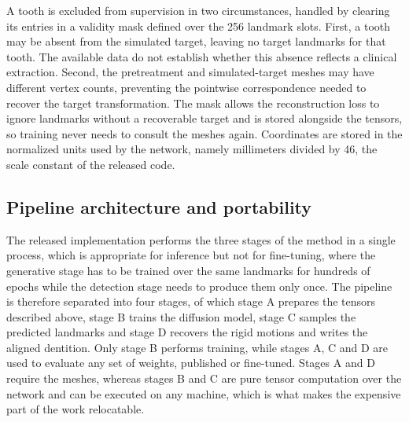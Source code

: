 \documentclass[10pt,a4paper]{article}
\begin{document}
A tooth is excluded from supervision in two circumstances, handled by clearing its entries in a validity mask defined over the 256 landmark slots. First, a tooth may be absent from the simulated target, leaving no target landmarks for that tooth. The available data do not establish whether this absence reflects a clinical extraction. Second, the pretreatment and simulated-target meshes may have different vertex counts, preventing the pointwise correspondence needed to recover the target transformation. The mask allows the reconstruction loss to ignore landmarks without a recoverable target and is stored alongside the tensors, so training never needs to consult the meshes again. Coordinates are stored in the normalized units used by the network, namely millimeters divided by 46, the scale constant of the released code.

\subsection{Pipeline architecture and portability}
\label{sec:pipeline}

The released implementation performs the three stages of the method in a single process, which is appropriate for inference but not for fine-tuning, where the generative stage has to be trained over the same landmarks for hundreds of epochs while the detection stage needs to produce them only once. The pipeline is therefore separated into four stages, of which stage A prepares the tensors described above, stage B trains the diffusion model, stage C samples the predicted landmarks and stage D recovers the rigid motions and writes the aligned dentition. Only stage B performs training, while stages A, C and D are used to evaluate any set of weights, published or fine-tuned. Stages A and D require the meshes, whereas stages B and C are pure tensor computation over the network and can be executed on any machine, which is what makes the expensive part of the work relocatable.
\end{document}
